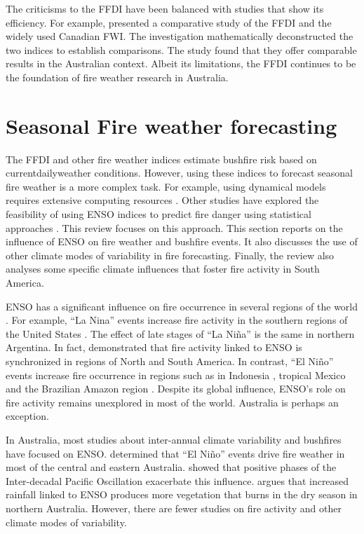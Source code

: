 The criticisms to the FFDI have been balanced with studies that show
its efficiency. For example, \citet{Dowdy2009} presented a comparative
study of the FFDI and the widely used Canadian FWI. The investigation mathematically
deconstructed the two indices to establish comparisons. The study
found that they offer comparable results in the Australian context.
Albeit its limitations, the FFDI continues to be the foundation
of fire weather research in Australia. 


\section{Seasonal Fire weather forecasting }

The FFDI and other fire weather indices estimate bushfire risk based
on current\textemdash daily\textemdash weather conditions. However,
using these indices to forecast seasonal fire weather is a more complex
task. For example, using dynamical models requires extensive computing
resources \citep{Roads2005}. Other studies have explored the feasibility
of using ENSO indices to predict fire danger using statistical approaches
\citep{Kitzberger2002,Nicholls2007,Harris2013}. This review focuses
on this approach. This section reports on the influence of ENSO on
fire weather and bushfire events. It also discusses the use of other
climate modes of variability in fire forecasting. Finally, the review
also analyses some specific climate influences that foster fire activity
in South America. 

ENSO has a significant influence on fire occurrence in several regions
of the world \citep{Carmona-Moreno2005}. For example, \textquotedblleft La
Nina\textquotedblright{} events increase fire activity in the southern
regions of the United States \citep{Swetnam1990,Beckage2003}. The
effect of late stages of ``La Ni\~na'' is the same in northern Argentina.
In fact, \citet{Kitzberger2001} demonstrated that fire activity linked
to ENSO is synchronized in regions of North and South America. In
contrast, \textquotedblleft El Ni\~no\textquotedblright{} events increase
fire occurrence in regions such as in Indonesia \citep{Wooster2012},
tropical Mexico \citep{Roman-Cuesta2003} and the Brazilian Amazon
region \citep{Barlow2004}. Despite its global influence, ENSO's role
on fire activity remains unexplored in most of the world. Australia
is perhaps an exception. 

In Australia, most studies about inter-annual climate variability
and bushfires have focused on ENSO. \citet{Williams1999} determined
that \textquotedblleft El Ni\~no\textquotedblright{} events drive fire
weather in most of the central and eastern Australia. \citet{Verdon2004}
showed that positive phases of the Inter-decadal Pacific Oscillation
exacerbate this influence. \citet{Harris2008} argues that increased
rainfall linked to ENSO produces more vegetation that burns in the
dry season in northern Australia. However, there are fewer studies
on fire activity and other climate modes of variability. 


